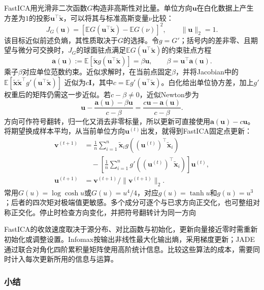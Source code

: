 FastICA用光滑非二次函数$G$构造非高斯性对比量。单位方向$\bm{u}$在白化数据上产生方差为$1$的投影$\bm{u}^{\top}\widetilde{\bm{x}}$，可以将其与标准高斯变量$\nu$比较：
\begin{equation}
  J_G(\bm{u})
  =\left[
    \mathbb{E}G(\bm{u}^{\top}\widetilde{\bm{x}})
    -\mathbb{E}G(\nu)
  \right]^2,
  \qquad \lVert\bm{u}\rVert_2=1.
  \label{eq:dim-fastica-contrast}
\end{equation}
该目标近似前述负熵，其性质取决于$G$的选择。令$g=G'$；括号内的差非零、且期望与微分可交换时，$J_G$的球面驻点满足$\mathbb{E}G(\bm{u}^{\top}\widetilde{\bm{x}})$的约束驻点方程
\[
  \bm{a}(\bm{u})
  :=\mathbb{E}\!\left[\widetilde{\bm{x}}
       g(\bm{u}^{\top}\widetilde{\bm{x}})\right]
  =\beta\bm{u},
  \qquad
  \beta=\bm{u}^{\top}\bm{a}(\bm{u}).
\]
乘子$\beta$对应单位范数约束。近似求解时，在当前点固定$\beta$，并将Jacobian中的
$\mathbb{E}[\widetilde{\bm{x}}\widetilde{\bm{x}}^{\top}
g'(\bm{u}^{\top}\widetilde{\bm{x}})]$
近似为$c\bm{I}$，其中$c=\mathbb{E}g'(\bm{u}^{\top}\widetilde{\bm{x}})$。白化给出单位协方差，加上$g'$权重后的矩阵仍需这一步近似。若$c-\beta\ne0$，近似Newton步为
\[
  \bm{u}-\frac{\bm{a}(\bm{u})-\beta\bm{u}}{c-\beta}
  =\frac{c\bm{u}-\bm{a}(\bm{u})}{c-\beta}.
\]
方向可作符号翻转，归一化又消去非零标量，所以更新可直接使用$\bm{a}(\bm{u})-c\bm{u}$。将期望换成样本平均，从当前单位方向$\bm{u}^{(t)}$出发，就得到FastICA固定点更新：
\begin{equation}
  \begin{aligned}
  \bm{v}^{(t+1)}
    &=\frac1n\sum_{i=1}^{n}
      \widetilde{\bm{x}}_i
           g((\bm{u}^{(t)})^{\top}\widetilde{\bm{x}}_i)\\
    &\quad-\left[\frac1n\sum_{i=1}^{n}
      g'((\bm{u}^{(t)})^{\top}\widetilde{\bm{x}}_i)\right]\bm{u}^{(t)},\\
  \bm{u}^{(t+1)}
    &=\bm{v}^{(t+1)}/\lVert\bm{v}^{(t+1)}\rVert_2.
  \end{aligned}
  \label{eq:dim-fastica}
\end{equation}
常用$G(u)=\log\cosh u$或$G(u)=u^4/4$，对应$g(u)=\tanh u$和$g(u)=u^3$；后者的四次矩对极端值更敏感。多个成分可逐个与已求方向正交化，也可整组对称正交化。停止时检查方向变化，并把符号翻转计为同一方向

FastICA的收敛速度取决于源分布、对比函数与初始化，更新向量接近零时需重新初始化或调整设置。Infomax按输出非线性最大化输出熵，采用梯度更新；JADE通过联合对角化四阶累积量矩阵使用高阶统计信息。比较这些算法的成本，需要同时计入每次更新所用的信息与运算。

\subsubsection{小结}
\label{sec:dim-ica-summary}


